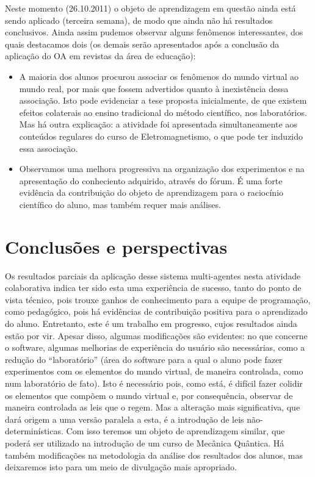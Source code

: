 \documentclass{article}
\begin{document}
Neste momento (26.10.2011) o objeto de aprendizagem em questão ainda está
sendo aplicado (terceira semana), de modo que ainda não há resultados conclusivos.
Ainda assim pudemos observar alguns fenômenos interessantes, dos quais destacamos
dois (os demais serão apresentados após a conclusão da aplicação do OA em revistas da
área de educação):

\begin{itemize}
\item A maioria dos alunos procurou associar os fenômenos do mundo virtual ao
mundo real, por mais que fossem advertidos quanto à inexistência dessa
associação. Isto pode evidenciar a tese proposta inicialmente, de que existem
efeitos colaterais ao ensino tradicional do método científico, nos laboratórios.
Mas há outra explicação: a atividade foi apresentada simultaneamente aos
conteúdos regulares do curso de Eletromagnetismo, o que pode ter induzido essa
associação.
\item Observamos uma melhora progressiva na organização dos experimentos e na
apresentação do conheciento adquirido, através do fórum. É uma forte evidência
da contribuição do objeto de aprendizagem para o raciocínio científico do aluno,
mas também requer mais análises.
\end{itemize}

\section{Conclusões e perspectivas}

Os resultados parciais da aplicação desse sistema multi-agentes nesta atividade
colaborativa indica ter sido esta uma experiência de sucesso, tanto do ponto de vista
técnico, pois trouxe ganhos de conhecimento para a equipe de programação, como
pedagógico, pois há evidências de contribuição positiva para o aprendizado do aluno.
Entretanto, este é um trabalho em progresso, cujos resultados ainda estão por
vir. Apesar disso, algumas modificações são evidentes: no que concerne o software,
algumas melhorias de experiência do usuário são necessárias, como a redução
do “laboratório” (área do software para a qual o aluno pode fazer experimentos com
os elementos do mundo virtual, de maneira controlada, como num laboratório de fato).
Isto é necessário pois, como está, é difícil fazer colidir os elementos que compõem o
mundo virtual e, por consequência, observar de maneira controlada as leis que o regem.
Mas a alteração mais significativa, que dará origem a uma versão paralela a esta, é a
introdução de leis não-determinísticas. Com isso teremos um objeto de aprendizagem
similar, que poderá ser utilizado na introdução de um curso de Mecânica Quântica.
Há também modificações na metodologia da análise dos resultados dos alunos, mas
deixaremos isto para um meio de divulgação mais apropriado.



\end{document}
